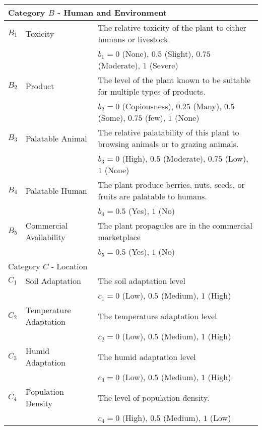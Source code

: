 \documentclass[12pt]{article}
\begin{document}
{{\begin{longtable}{p{0.2in}p{1.5in}p{4.3in}}
				\midrule
				\multicolumn{3}{l}{Category $B$ - Human and Environment}  \\
				\midrule
				
				$B_1$ & Toxicity & The relative toxicity of the plant to either humans or livestock.\\
					&& $b_1=0$ (None), $0.5$ (Slight), $0.75$ (Moderate), $1$ (Severe)\\
				$B_2$ & Product & The level of the plant known to be suitable for multiple types of products.\\
					&& $b_2=0$ (Copiousness), $0.25$ (Many), $0.5$ (Some), $0.75$ (few), $1$ (None)\\
				$B_3$ & Palatable Animal & The relative palatability of this plant to browsing animals or to grazing animals.\\
					&& $b_3=0$ (High), $0.5$ (Moderate), $0.75$ (Low), $1$ (None)\\
				$B_4$ & Palatable Human & The plant produce berries, nuts, seeds, or fruits are palatable to humans. \\
					&& $b_4=0.5$ (Yes), $1$ (No)\\
				$B_5$ & Commercial Availability & The plant propagules are in the commercial marketplace \\
					&& $b_5=0.5$ (Yes), $1$ (No)\\
			
				\midrule
				\multicolumn{3}{l}{Category $C$ - Location}  \\
				\midrule
				
				$C_1$ & Soil Adaptation & The soil adaptation level\\
				&& $c_1=0$ (Low), $0.5$ (Medium), $1$ (High)\\
				$C_2$ & Temperature Adaptation & The temperature adaptation level\\
				&& $c_2=0$ (Low), $0.5$ (Medium), $1$ (High)\\
				$C_3$ & Humid Adaptation & The humid adaptation level\\
				&& $c_3=0$ (Low), $0.5$ (Medium), $1$ (High)\\
				$C_4$ & Population Density & The level of population density.\\
				&& $c_4=0$ (High), $0.5$ (Medium), $1$ (Low)\\
			
				\bottomrule
			
			\end{longtable}
			}
		}
		
\end{document}
